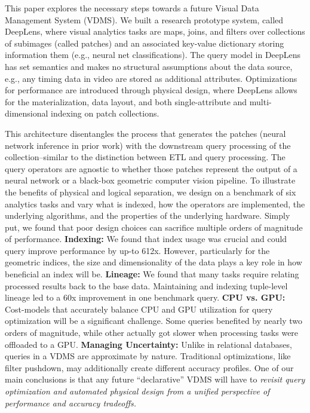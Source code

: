 This paper explores the necessary steps towards a future Visual Data Management System (VDMS).
We built a research prototype system, called \textsf{DeepLens}, where visual analytics tasks are maps, joins, and filters over collections of subimages (called patches) and an associated key-value dictionary storing information them (e.g., neural net classifications). The query model in \textsf{DeepLens} has set semantics and makes no structural assumptions about the data source, e.g., any timing data in video are stored as additional attributes. Optimizations for performance are introduced through physical design, where \textsf{DeepLens} allows for the materialization, data layout, and both single-attribute and multi-dimensional indexing on patch collections.

This architecture disentangles the process that generates the patches (neural network inference in prior work) with the downstream query processing of the collection--similar to the distinction between ETL and query processing.
The query operators are agnostic to whether those patches represent the output of a neural network or a black-box geometric computer vision pipeline. 
To illustrate the benefits of physical and logical separation, we 
 design on a benchmark of six analytics tasks and vary what is indexed, how the operators are implemented, the underlying algorithms, and the properties of the underlying hardware.
 Simply put, we found that poor design choices can sacrifice multiple orders of magnitude of performance.
\textbf{Indexing: } We found that index usage was crucial and could query improve performance by up-to 612x. However, particularly for the geometric indices, the size and dimensionality of the data plays a key role in how beneficial an index will be.
\textbf{Lineage: }We found that many tasks require relating processed results back to the base data.
Maintaining and indexing tuple-level lineage led to a 60x improvement in one benchmark query.
\textbf{CPU vs. GPU: } Cost-models that accurately balance CPU and GPU utilization for query optimization will be a significant challenge. Some queries benefited by nearly two orders of magnitude, while other actually got slower when processing tasks were offloaded to a GPU.
\textbf{Managing Uncertainty: } Unlike in relational databases, queries in a VDMS are approximate by nature. Traditional optimizations, like filter pushdown, may additionally create different accuracy profiles.  One of our main conclusions is that any future ``declarative'' VDMS will have to \emph{revisit query optimization and automated physical design from a unified perspective of performance and accuracy tradeoffs.}  







